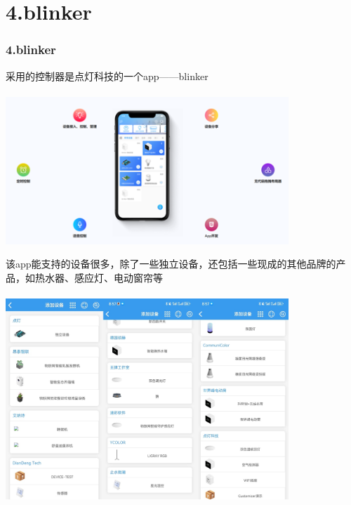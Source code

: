 \documentclass[16pt]{beamer}	%
\newcommand{\ftitle}[1]{\frametitle{#1}}	%
\begin{document}
		\section{4.blinker}
		\begin{frame}
			\ftitle{4.blinker}
			采用的控制器是点灯科技的一个app——blinker\\ \hspace*{\fill} \\
			\includegraphics[width=0.8\textwidth]{pic/4-1.png}
	    \end{frame}	
		\begin{frame}
		该app能支持的设备很多，除了一些独立设备，还包括一些现成的其他品牌的产品，如热水器、感应灯、电动窗帘等
		\\ \hspace*{\fill} \\\centering \includegraphics[width=0.8\textwidth]{pic/4-2.png}
        \end{frame}	
\end{document}
